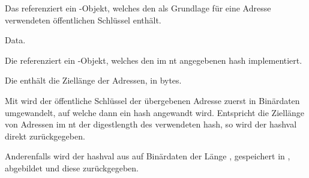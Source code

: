 \begin{description}

		Das \javaarg {} referenziert ein -Objekt, welches den
		als Grundlage für eine Adresse verwendeten öffentlichen Schlüssel enthält.

		\glsdesc{Data}.

		Die \javainstvar {} referenziert ein -Objekt, welches den
		im \gls{nt} angegebenen \gls{hash} implementiert.

		Die \javainstvar {} enthält die Ziellänge der Adressen, in bytes.

\end{description}

Mit  wird der öffentliche Schlüssel der übergebenen Adresse zuerst in Binärdaten
umgewandelt, auf welche dann ein \gls{hash} angewandt wird. Entspricht die Ziellänge von Adressen im
\gls{nt} der \gls{digestlength} des verwendeten \gls{hash}, so wird der \gls{hashval} 
direkt zurückgegeben.

Anderenfalls wird der \gls{hashval} aus  auf Binärdaten der Länge ,
gespeichert in , abgebildet und diese zurückgegeben.
